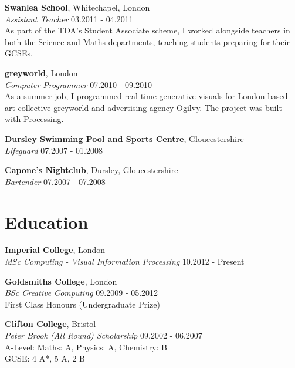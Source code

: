 \documentclass[margin,line,a4paper]{resume}
\begin{document}
\begin{resume}
\textbf{Swanlea School}, Whitechapel, London \vspace{1mm}\\
\textsl{Assistant Teacher} \hfill 03.2011 - 04.2011 \vspace{2mm} \\
As part of the TDA’s Student Associate scheme, I worked alongside teachers in both the Science and Maths departments, teaching students preparing for their GCSEs.

\textbf{greyworld}, London  \vspace{1mm}\\
\textsl{Computer Programmer} \hfill 07.2010 - 09.2010 \vspace{2mm} \\
As a summer job, I programmed real-time generative visuals for London based art collective \href{http://greyworld.org}{greyworld} and advertising agency Ogilvy. The project was built with Processing.

\textbf{Dursley Swimming Pool and Sports Centre}, Gloucestershire  \vspace{1mm}\\
\textsl{Lifeguard} \hfill 07.2007 - 01.2008

\textbf{Capone's Nightclub}, Dursley, Gloucestershire  \vspace{1mm}\\
\textsl{Bartender} \hfill 07.2007 - 07.2008 \vspace{2mm} \\

\section{\mysidestyle Education}

\textbf{Imperial College}, London \vspace{1mm}\\
\textsl{MSc Computing - Visual Information Processing} \hfill 10.2012 - Present

\textbf{Goldsmiths College}, London \vspace{1mm}\\
\textsl{BSc Creative Computing} \hfill 09.2009 - 05.2012 \vspace{2mm} \\
First Class Honours (Undergraduate Prize)

\textbf{Clifton College}, Bristol \vspace{1mm}\\
\textsl{Peter Brook (All Round) Scholarship} \hfill 09.2002 - 06.2007 \vspace{2mm} \\
A-Level: Maths: A, Physics: A, Chemistry: B \\
GCSE: 4 A*, 5 A, 2 B \\



\end{resume}
\end{document}
